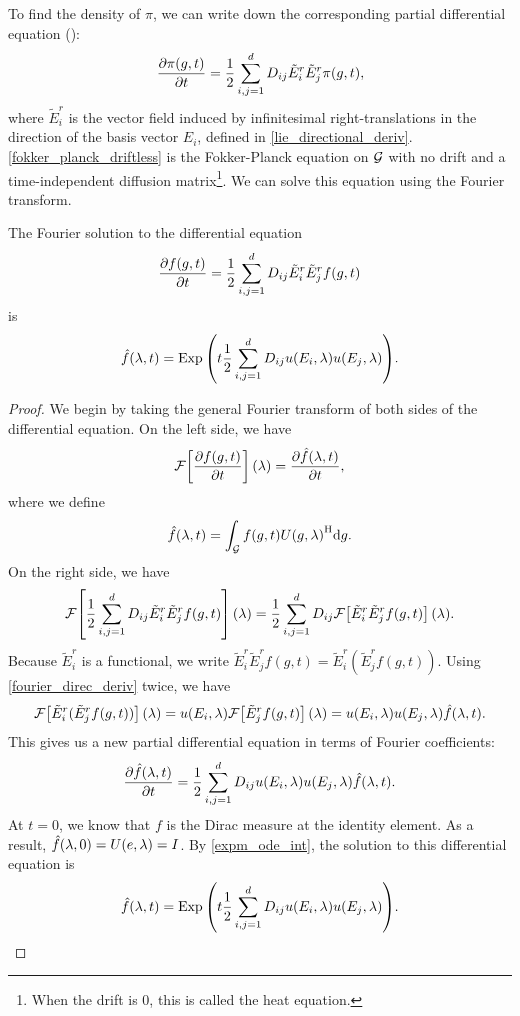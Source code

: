 \documentclass[../../main.tex]{subfiles}
\begin{document}
\begin{refsection}
	To find the density of $\pi$, we can write down the corresponding partial differential equation (\cite[Equation 20.14]{chirikjianStochasticModelsInformation2012}):
	\begin{equation}\label{fokker_planck_driftless}
		\pdv{\pi(g, t)}{t} = \frac{1}{2} \sum_{i,j=1}^d D_{ij} \tilde{E}_i^r \tilde{E}_j^r \pi(g, t),
	\end{equation}
	where $\tilde{E}_i^r$ is the vector field induced by infinitesimal right-translations in the direction of the basis vector $E_i$, defined in \cref{lie_directional_deriv}.
	\cref{fokker_planck_driftless} is the Fokker-Planck equation on $\mathcal{G}$ with no drift and a time-independent diffusion matrix\footnote{
		When the drift is 0, this is called the heat equation.
	}.
	We can solve this equation using the Fourier transform.
	\clearpage %
	\begin{theorem}
		The Fourier solution to the differential equation
		$$\pdv{f(g, t)}{t} = \frac{1}{2} \sum_{i,j=1}^d D_{ij} \tilde{E}_i^r \tilde{E}_j^r f(g, t)$$
		is
		$$\hat{f}(\lambda, t) = \operatorname{Exp}\qty(t \frac{1}{2} \sum_{i,j=1}^d D_{ij} u(E_i, \lambda) u(E_j, \lambda)).$$
	\end{theorem}
	\begin{proof}
		We begin by taking the general Fourier transform of both sides of the differential equation.
		On the left side, we have
		$$\mathcal{F}\qty[\pdv{f(g, t)}{t}](\lambda) = \pdv{\hat{f}(\lambda, t)}{t},$$
		where we define
		$$\hat{f}(\lambda, t) = \int_{\mathcal{G}} f(g, t) {U(g, \lambda)}^\mathrm{H} \dd g.$$
		On the right side, we have
		$$\mathcal{F}\qty[\frac{1}{2} \sum_{i,j=1}^d D_{ij} \tilde{E}_i^r \tilde{E}_j^r f(g, t)](\lambda) = \frac{1}{2} \sum_{i,j=1}^d D_{ij} \mathcal{F}\qty[\tilde{E}_i^r \tilde{E}_j^r f(g, t)](\lambda).$$
		Because $\tilde{E}_i^r$ is a functional, we write $\tilde{E}_i^r \tilde{E}_j^r f(g, t) = \tilde{E}_i^r(\tilde{E}_j^r f(g, t))$.
		Using \cref{fourier_direc_deriv} twice, we have
		$$\mathcal{F}\qty[\tilde{E}_i^r(\tilde{E}_j^r f(g, t))](\lambda) = u(E_i, \lambda) \mathcal{F}\qty[\tilde{E}_j^r f(g, t)](\lambda) = u(E_i, \lambda) u(E_j, \lambda) \hat{f}(\lambda, t).$$
		This gives us a new partial differential equation in terms of Fourier coefficients:
		$$\pdv{\hat{f}(\lambda, t)}{t} = \frac{1}{2} \sum_{i,j=1}^d D_{ij} u(E_i, \lambda) u(E_j, \lambda) \hat{f}(\lambda, t).$$
		At $t=0$, we know that $f$ is the Dirac measure at the identity element.
		As a result, $\hat{f}(\lambda, 0) = U(e, \lambda) = I$.
		By \cref{expm_ode_int}, the solution to this differential equation is
		$$\hat{f}(\lambda, t) = \operatorname{Exp}\qty(t \frac{1}{2} \sum_{i,j=1}^d D_{ij} u(E_i, \lambda) u(E_j, \lambda)).$$
	\end{proof}


\end{refsection}
\end{document}

